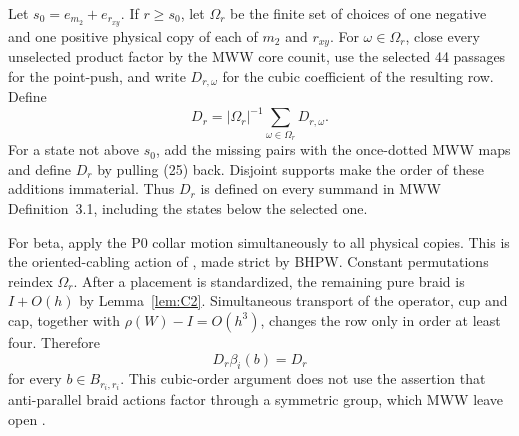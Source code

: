 Let $s_0=e_{m_2}+e_{r_{xy}}$.  If $r\ge s_0$, let $\Omega_r$ be the finite set
of choices of one negative and one positive physical copy of each of $m_2$
and $r_{xy}$.  For $\omega\in\Omega_r$, close every unselected product factor
by the MWW core counit, use the selected 44 passages for the point-push, and
write $D_{r,\omega}$ for the cubic coefficient of the resulting row.  Define
\[
D_r=|\Omega_r|^{-1}\sum_{\omega\in\Omega_r}D_{r,\omega}.
\tag{25}
\]
For a state not above $s_0$, add the missing pairs with the once-dotted MWW
maps and define $D_r$ by pulling (25) back.  Disjoint supports make the order
of these additions immaterial.  Thus $D_r$ is defined on
every summand in
MWW Definition~3.1, including the states below the selected one.

For beta, apply the P0 collar motion simultaneously to all physical copies.
This is the oriented-cabling action of
\cite[Theorem~E]{BeliakovaPutyraWehrli2019}, made strict by BHPW.  Constant
permutations reindex $\Omega_r$.  After a placement is standardized, the
remaining pure braid is \(I+O(h)\) by Lemma~\ref{lem:C2}.  Simultaneous transport of the
operator, cup and cap, together with $\rho(W)-I=O(h^3)$, changes the row only
in order at least four.  Therefore
\[
D_r\beta_i(b)=D_r
\tag{26}
\]
for every $b\in B_{r_i,r_i}$.  This cubic-order argument does not use the
assertion that anti-parallel braid actions factor through a symmetric group,
which MWW leave open
\cite[Remark~3.3]{ManolescuWalkerWedrich2023}.

